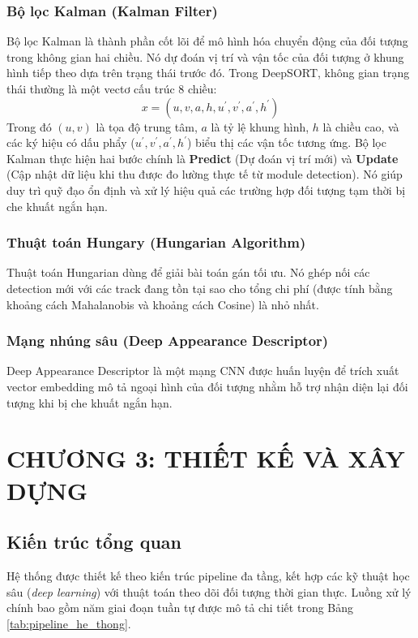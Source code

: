 \documentclass[a4paper,12pt]{article}
\begin{document}
\subsubsection{Bộ lọc Kalman (Kalman Filter)} 
Bộ lọc Kalman là thành phần cốt lõi để mô hình hóa chuyển động của đối tượng trong không gian hai chiều. Nó dự đoán vị trí và vận tốc của đối tượng ở khung hình tiếp theo dựa trên trạng thái trước đó. Trong DeepSORT, không gian trạng thái thường là một vectơ cấu trúc 8 chiều:
\[
x = (u, v, a, h, u^\prime, v^\prime, a^\prime, h^\prime)
\]
Trong đó $(u, v)$ là tọa độ trung tâm, $a$ là tỷ lệ khung hình, $h$ là chiều cao, và các ký hiệu có dấu phẩy ($u^\prime, v^\prime, a^\prime, h^\prime$) biểu thị các vận tốc tương ứng. Bộ lọc Kalman thực hiện hai bước chính là \textbf{Predict} (Dự đoán vị trí mới) và \textbf{Update} (Cập nhật dữ liệu khi thu được đo lường thực tế từ module detection). Nó giúp duy trì quỹ đạo ổn định và xử lý hiệu quả các trường hợp đối tượng tạm thời bị che khuất ngắn hạn.

\subsubsection{Thuật toán Hungary (Hungarian Algorithm)}

Thuật toán Hungarian dùng để giải bài toán gán tối ưu. Nó ghép nối các detection mới với các track đang tồn tại sao cho tổng chi phí (được tính bằng khoảng cách Mahalanobis và khoảng cách Cosine) là nhỏ nhất. 

\subsubsection{Mạng nhúng sâu (Deep Appearance Descriptor)}
Deep Appearance Descriptor là một mạng CNN được huấn luyện để trích xuất vector embedding mô tả ngoại hình của đối tượng nhằm hỗ trợ nhận diện lại đối tượng khi bị che khuất ngắn hạn.

\newpage
\section{CHƯƠNG 3: THIẾT KẾ VÀ XÂY DỰNG}
\subsection{Kiến trúc tổng quan}
Hệ thống được thiết kế theo kiến trúc pipeline đa tầng, kết hợp các kỹ thuật học sâu (\textit{deep learning}) với thuật toán theo dõi đối tượng thời gian thực. Luồng xử lý chính bao gồm năm giai đoạn tuần tự được mô tả chi tiết trong Bảng \ref{tab:pipeline_he_thong}.
\end{document}
